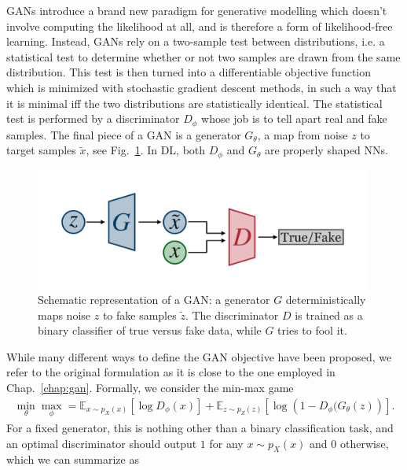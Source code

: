 GANs introduce a brand new paradigm for generative modelling which doesn't involve computing the likelihood at all, and is therefore a form of likelihood-free learning. Instead, GANs rely on a two-sample test between distributions, i.e. a statistical test to determine whether or not two samples are drawn from the same distribution. This test is then turned into a differentiable objective function which is minimized with stochastic gradient descent methods, in such a way that it is minimal iff the two distributions are statistically identical.
The statistical test is performed by a discriminator $D_{\phi}$ whose job is to tell apart real and fake samples. The final piece of a GAN is a generator $G_{\theta}$, a map from noise $z$ to target samples $\tilde{x}$, see Fig.~\ref{fig:gan}. In DL, both $D_{\phi}$ and $G_{\theta}$ are properly shaped NNs.
%
\begin{figure}[t]
\centering
\includegraphics[page = 1, width=0.99\textwidth]{./figures/gan}
\caption{Schematic representation of a GAN: a generator $G$ deterministically maps noise $z$ to fake samples $\tilde{z}$. The discriminator $D$ is trained as a binary classifier of true versus fake data, while $G$ tries to fool it.}
\label{fig:gan}
\end{figure}
%
While many different ways to define the GAN objective have been proposed, we refer to the original formulation as it is close to the one employed in Chap.~\ref{chap:gan}. Formally, we consider the min-max game 
%
\begin{align}
\min_{\theta} \max_{\phi} = \mathbb{E}_{x \sim p_{X}(x)} \left[ \log D_{\phi} (x) \right] + \mathbb{E}_{z\sim p_{Z}(z)} \left[ \log \left( 1 - D_{\phi} (G_{\theta}(z) \right) \right].
\end{align}
%
For a fixed generator, this is nothing other than a binary classification task, and an optimal discriminator should output $1$ for any $x \sim p_{X}(x)$ and $0$ otherwise, which we can summarize as
